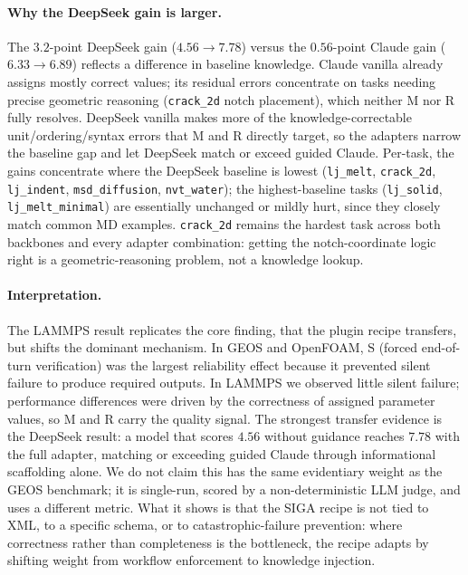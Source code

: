 \documentclass{article}
\begin{document}
\paragraph{Why the DeepSeek gain is larger.}
The $3.2$-point DeepSeek gain ($4.56\to7.78$) versus the $0.56$-point Claude gain ($6.33\to6.89$) reflects a difference in baseline knowledge. Claude vanilla already assigns mostly correct values; its residual errors concentrate on tasks needing precise geometric reasoning (\texttt{crack\_2d} notch placement), which neither $\mathrm{M}$ nor $\mathrm{R}$ fully resolves. DeepSeek vanilla makes more of the knowledge-correctable unit/ordering/syntax errors that $\mathrm{M}$ and $\mathrm{R}$ directly target, so the adapters narrow the baseline gap and let DeepSeek match or exceed guided Claude. Per-task, the gains concentrate where the DeepSeek baseline is lowest (\texttt{lj\_melt}, \texttt{crack\_2d}, \texttt{lj\_indent}, \texttt{msd\_diffusion}, \texttt{nvt\_water}); the highest-baseline tasks (\texttt{lj\_solid}, \texttt{lj\_melt\_minimal}) are essentially unchanged or mildly hurt, since they closely match common MD examples. \texttt{crack\_2d} remains the hardest task across both backbones and every adapter combination: getting the notch-coordinate logic right is a geometric-reasoning problem, not a knowledge lookup.

\paragraph{Interpretation.}
The LAMMPS result replicates the core finding, that the plugin recipe transfers, but shifts the dominant mechanism. In GEOS and OpenFOAM, $\mathrm{S}$ (forced end-of-turn verification) was the largest reliability effect because it prevented silent failure to produce required outputs. In LAMMPS we observed little silent failure; performance differences were driven by the correctness of assigned parameter values, so $\mathrm{M}$ and $\mathrm{R}$ carry the quality signal. The strongest transfer evidence is the DeepSeek result: a model that scores $4.56$ without guidance reaches $7.78$ with the full adapter, matching or exceeding guided Claude through informational scaffolding alone. We do not claim this has the same evidentiary weight as the GEOS benchmark; it is single-run, scored by a non-deterministic LLM judge, and uses a different metric. What it shows is that the SIGA recipe is not tied to XML, to a specific schema, or to catastrophic-failure prevention: where correctness rather than completeness is the bottleneck, the recipe adapts by shifting weight from workflow enforcement to knowledge injection.
\end{document}
